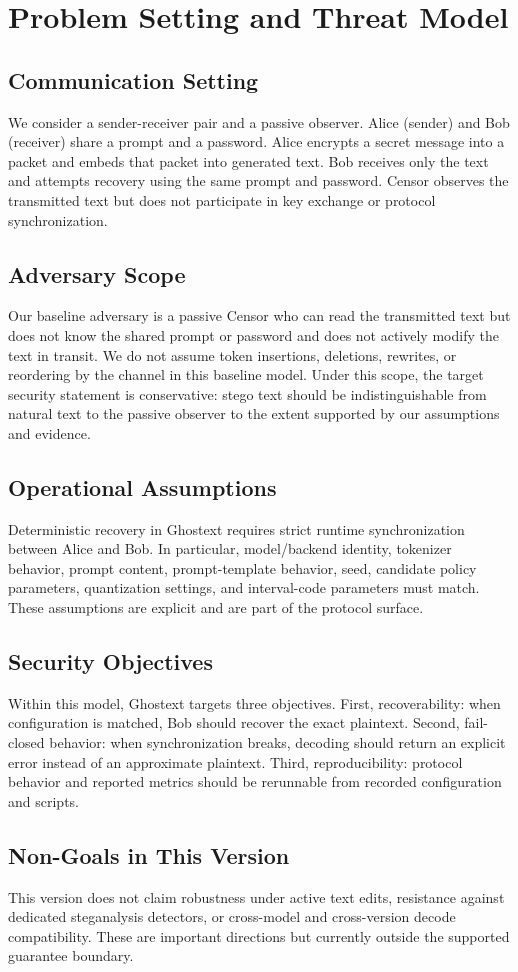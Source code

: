 \section{Problem Setting and Threat Model}
\subsection{Communication Setting}
We consider a sender-receiver pair and a passive observer. Alice (sender) and Bob (receiver) share a prompt and a password. Alice encrypts a secret message into a packet and embeds that packet into generated text. Bob receives only the text and attempts recovery using the same prompt and password. Censor observes the transmitted text but does not participate in key exchange or protocol synchronization.

\subsection{Adversary Scope}
Our baseline adversary is a passive Censor who can read the transmitted text but does not know the shared prompt or password and does not actively modify the text in transit. We do not assume token insertions, deletions, rewrites, or reordering by the channel in this baseline model. Under this scope, the target security statement is conservative: stego text should be indistinguishable from natural text to the passive observer to the extent supported by our assumptions and evidence.

\subsection{Operational Assumptions}
Deterministic recovery in Ghostext requires strict runtime synchronization between Alice and Bob. In particular, model/backend identity, tokenizer behavior, prompt content, prompt-template behavior, seed, candidate policy parameters, quantization settings, and interval-code parameters must match. These assumptions are explicit and are part of the protocol surface.

\subsection{Security Objectives}
Within this model, Ghostext targets three objectives. First, recoverability: when configuration is matched, Bob should recover the exact plaintext. Second, fail-closed behavior: when synchronization breaks, decoding should return an explicit error instead of an approximate plaintext. Third, reproducibility: protocol behavior and reported metrics should be rerunnable from recorded configuration and scripts.

\subsection{Non-Goals in This Version}
This version does not claim robustness under active text edits, resistance against dedicated steganalysis detectors, or cross-model and cross-version decode compatibility. These are important directions but currently outside the supported guarantee boundary.
